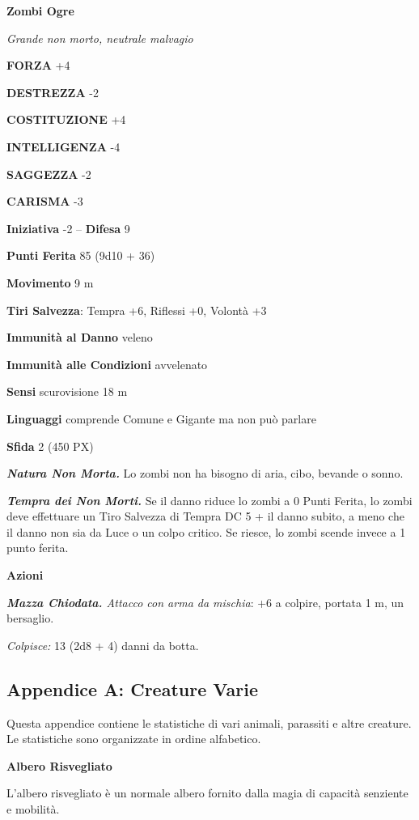 \begin{multicols}{2}
\medskip{}\textbf{Zombi Ogre}

\textit{Grande non morto, neutrale malvagio}

\textbf{FORZA} +4

\textbf{DESTREZZA} -2

\textbf{COSTITUZIONE} +4

\textbf{INTELLIGENZA} -4

\textbf{SAGGEZZA} -2

\textbf{CARISMA} -3

\textbf{Iniziativa} -2 -- \textbf{Difesa} 9

\textbf{Punti Ferita} 85 (9d10 + 36)

\textbf{Movimento} 9 m

\textbf{Tiri Salvezza}: Tempra +6, Riflessi +0, Volontà +3

\textbf{Immunità al Danno} veleno

\textbf{Immunità alle Condizioni} avvelenato

\textbf{Sensi} scurovisione 18 m

\textbf{Linguaggi} comprende Comune e Gigante ma non può parlare

\textbf{Sfida} 2 (450 PX)

\textit{\textbf{Natura Non Morta.}} Lo zombi non ha bisogno di aria, cibo, bevande o sonno.

\textit{\textbf{Tempra dei Non Morti.}} Se il danno riduce lo zombi a 0 Punti Ferita, lo zombi deve effettuare un Tiro Salvezza di Tempra DC 5 + il danno subito, a meno che il danno non sia da Luce o un colpo critico. Se riesce, lo zombi scende invece a 1 punto ferita.

\textbf{Azioni}

\textit{\textbf{Mazza Chiodata.} Attacco con arma da mischia}: +6 a colpire, portata 1 m, un bersaglio.

\textit{Colpisce:} 13 (2d8 + 4) danni da botta.


\subsection{Appendice A: Creature Varie}

Questa appendice contiene le statistiche di vari animali, parassiti e
altre creature. Le statistiche sono organizzate in ordine alfabetico.

\medskip\textbf{Albero Risvegliato}

L'albero risvegliato è un normale albero fornito dalla magia di capacità
senziente e mobilità.


\end{multicols}
